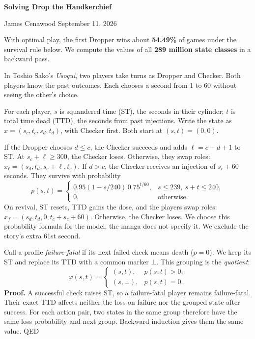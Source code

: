 \documentclass[10pt]{article}
\newcommand{\head}[1]{\par\vspace{5pt}{\large\bfseries #1}\par\vspace{2pt}}
\begin{document}
{\LARGE\bfseries Solving Drop the Handkerchief}\par
James Cenawood \hfill September 11, 2026
\vspace{4pt}

With optimal play, the first Dropper wins about \textbf{54.49\%} of games under the survival rule below.
We compute the values of all \textbf{289 million state classes} in a backward pass.

\begin{minipage}[t]{0.505\textwidth}
\vspace{0pt}
\head{1. The game}
In Toshio Sako's \emph{Usogui}, two players take turns as Dropper and Checker.
Both players know the past outcomes. Each chooses a second from 1 to 60 without seeing the other's choice.

For each player, $s$ is squandered time (ST), the seconds in their cylinder;
$t$ is total time dead (TTD), the seconds from past injections.
Write the state as $x=(s_c,t_c,s_d,t_d)$, with Checker first.
Both start at $(s,t)=(0,0)$.

If the Dropper chooses $d\le c$, the Checker succeeds and adds
$\ell=c-d+1$ to ST. At $s_c+\ell\ge300$, the Checker loses.
Otherwise, they swap roles:
$x_\ell=(s_d,t_d,s_c+\ell,t_c)$.
If $d>c$, the Checker receives an injection of $s_c+60$ seconds.
They survive with probability
\[
p(s,t)=\begin{cases}
0.95(1-s/240)\,0.75^{t/60},&s\le239,\ s+t\le240,\\
0,&\text{otherwise}.
\end{cases}
\]
On revival, ST resets, TTD gains the dose, and the players swap roles:
$x_f=(s_d,t_d,0,t_c+s_c+60)$. Otherwise, the Checker loses.
We choose this probability formula for the model; the manga does not specify it.
We exclude the story's extra 61st second.

\head{2. Merge states with the same future}
Call a profile \emph{failure-fatal} if its next failed check means death ($p=0$).
We keep its ST and replace its TTD with a common marker $\bot$.
This grouping is the \emph{quotient}:
\[
\varphi(s,t)=\begin{cases}(s,t),&p(s,t)>0,\\(s,\bot),&p(s,t)=0.\end{cases}
\]
\textbf{Proof.} A successful check raises ST, so a failure-fatal player
remains failure-fatal. Their exact TTD affects neither the loss on failure
nor the grouped state after success. For each action pair, two states in
the same group therefore have the same loss probability and next group.
Backward induction gives them the same value. \textup{QED}


\end{minipage}
\end{document}
